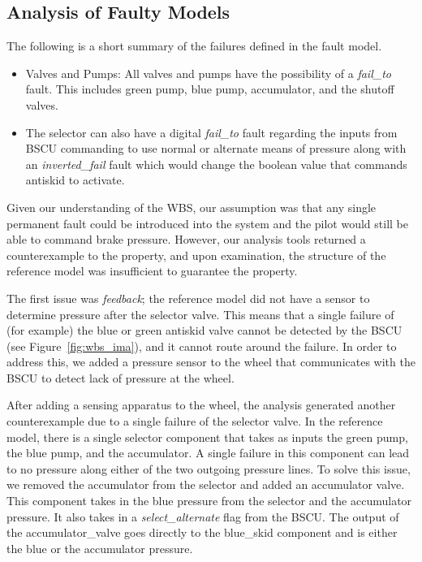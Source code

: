 \subsection{Analysis of Faulty Models}
The following is a short summary of the failures defined in the fault model.

\begin{itemize}

\item Valves and Pumps: All valves and pumps have the possibility of a \textit{fail\_to} fault. This includes green pump, blue pump, accumulator, and the shutoff valves.

\item  The selector can also have a digital \textit{fail\_to} fault regarding the inputs from BSCU commanding to use normal or alternate means of pressure along with an \textit{inverted\_fail} fault which would change the boolean value that commands antiskid to activate.

\end{itemize}

Given our understanding of the WBS, our assumption was that any single permanent fault could be introduced into the system and the pilot would still be able to command brake pressure.  However, our analysis tools returned a counterexample to the property, and upon examination, the structure of the reference model was insufficient to guarantee the property.

The first issue was {\em feedback}; the reference model did not have a sensor to determine pressure after the selector valve.  This means that a single failure of (for example) the blue or green antiskid valve cannot be detected by the BSCU (see Figure~\ref{fig:wbs_ima}), and it cannot route around the failure.  In order to address this, we added a pressure sensor to the wheel that communicates with the BSCU to detect lack of pressure at the wheel.


After adding a sensing apparatus to the wheel, the analysis generated another counterexample due to a single failure of the selector valve.  In the reference model, there is a single selector component that takes as inputs the green pump, the blue pump, and the accumulator.  A single failure in this component can lead to no pressure along either of the two outgoing pressure lines.
To solve this issue, we removed the accumulator from the selector and added an accumulator valve.   This component takes in the blue pressure from the selector and the accumulator pressure. It also takes in a \textit{select\_alternate} flag from the BSCU. The output of the accumulator\_valve goes directly to the blue\_skid component and is either the blue or the accumulator pressure.

